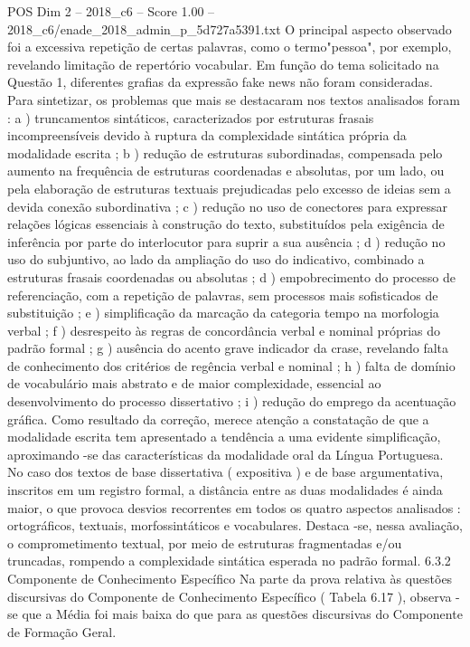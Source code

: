 \begin{textsample}{POS Dim 2 – 2018\_c6 – Score 1.00 – 2018\_c6/enade\_2018\_admin\_p\_5d727a5391.txt}
O principal aspecto observado foi a excessiva repetição de certas palavras, como o termo"pessoa", por exemplo, revelando limitação de repertório vocabular.
Em função do tema solicitado na Questão 1, diferentes grafias da expressão fake news não foram consideradas.
Para sintetizar, os problemas que mais se destacaram nos textos analisados foram : a ) truncamentos sintáticos, caracterizados por estruturas frasais incompreensíveis devido à ruptura da complexidade sintática própria da modalidade escrita ; b ) redução de estruturas subordinadas, compensada pelo aumento na frequência de estruturas coordenadas e absolutas, por um lado, ou pela elaboração de estruturas textuais prejudicadas pelo excesso de ideias sem a devida conexão subordinativa ; c ) redução no uso de conectores para expressar relações lógicas essenciais à construção do texto, substituídos pela exigência de inferência por parte do interlocutor para suprir a sua ausência ; d ) redução no uso do subjuntivo, ao lado da ampliação do uso do indicativo, combinado a estruturas frasais coordenadas ou absolutas ; d ) empobrecimento do processo de referenciação, com a repetição de palavras, sem processos mais sofisticados de substituição ; e ) simplificação da marcação da categoria tempo na morfologia verbal ; f ) desrespeito às regras de concordância verbal e nominal próprias do padrão formal ; g ) ausência do acento grave indicador da crase, revelando falta de conhecimento dos critérios de regência verbal e nominal ; h ) falta de domínio de vocabulário mais abstrato e de maior complexidade, essencial ao desenvolvimento do processo dissertativo ; i ) redução do emprego da acentuação gráfica.
Como resultado da correção, merece atenção a constatação de que a modalidade escrita tem apresentado a tendência a uma evidente simplificação, aproximando -se das características da modalidade oral da Língua Portuguesa.
No caso dos textos de base dissertativa ( expositiva ) e de base argumentativa, inscritos em um registro formal, a distância entre as duas modalidades é ainda maior, o que provoca desvios recorrentes em todos os quatro aspectos analisados : ortográficos, textuais, morfossintáticos e vocabulares.
Destaca -se, nessa avaliação, o comprometimento textual, por meio de estruturas fragmentadas e/ou truncadas, rompendo a complexidade sintática esperada no padrão formal. 6.3.2 Componente de Conhecimento Específico Na parte da prova relativa às questões discursivas do Componente de Conhecimento Específico ( Tabela 6.17 ), observa -se que a Média foi mais baixa do que para as questões discursivas do Componente de Formação Geral.

\end{textsample}
